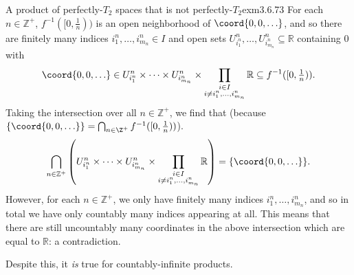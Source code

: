 \begin{exm}{A product of perfectly-$T_2$ spaces that is not perfectly-$T_2$}{exm3.6.73}
For each $n\in \mathbb{Z}^+$, $f^{-1}([0,\frac{1}{n}))$ is an open neighborhood of $\coord{0,0,\ldots}$, and so there are finitely many indices $i_1^n,\ldots ,i_{m_n}^n\in I$ and open sets $U_{i_1^n}^n,\ldots ,U_{i_{m_n}^n}^n\subseteq \mathbb{R}$ containing $0$ with
\begin{equation}
\coord{0,0,\ldots}\in U_{i_1^n}^n\times \cdots \times U_{i_{m_n}^n}^n\times \prod _{\substack{i\in I \\ i\neq i_1^n,\ldots ,i_{m_n}^n}}\mathbb{R}\subseteq f^{-1}([0,\tfrac{1}{n})).
\end{equation}
Taking the intersection over all $n\in \mathbb{Z}^+$, we find that (because $\{ \coord{0,0,\ldots}\} =\bigcap _{n\in \Z ^+}f^{-1}([0,\frac{1}{n}))$).
\begin{equation}
\bigcap _{n\in \mathbb{Z}^+}\left( U_{i_1^n}^n\times \cdots \times U_{i_{m_n}^n}^n\times \prod _{\substack{i\in I \\ i\neq i_1^n,\ldots ,i_{m_n}^n}}\mathbb{R}\right) =\{ \coord{0,0,\ldots}\} .
\end{equation}
However, for each $n\in \mathbb{Z}^+$, we only have finitely many indices $i_1^n,\ldots ,i_{m_n}^n$, and so in total we have only countably many indices appearing at all.  This means that there are still uncountably many coordinates in the above intersection which are equal to $\mathbb{R}$:  a contradiction.
\end{exm}
Despite this, it \emph{is} true for countably-infinite products.
